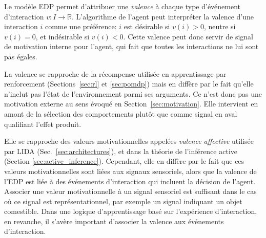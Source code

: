 \noindent
Le modèle EDP permet d'attribuer une \emph{valence} à chaque type d'événement d'interaction  $v: I \to \mathbb{R}$. 
L'algorithme de l'agent peut interpréter la valence d'une interaction $i$ comme une préférence: $i$ est désirable si $v(i) > 0$, neutre si $v(i) = 0$, et indésirable si $v(i) < 0$.
Cette valence peut donc servir de signal de motivation interne pour l'agent, qui fait que toutes les interactions ne lui sont pas égales. 

La valence se rapproche de la récompense utilisée en apprentissage par renforcement (Sections~\ref{sec:rl} et \ref{sec:pomdp}) mais en diffère par le fait qu'elle n'inclut pas l'état de l'environnement parmi ses arguments.
Ce n'est donc pas une motivation externe au sens évoqué en Section~\ref{sec:motivation}.
Elle intervient en amont de la sélection des comportements plutôt que comme signal en aval qualifiant l'effet produit.

Elle se rapproche des valeurs motivationnelles appelées \emph{valence affective} utilisée par LIDA (Sec.~\ref{sec:architectures}), et  dans la théorie de l'inférence active (Section \ref{sec:active_inference}). 
Cependant, elle en diffère par le fait que ces valeurs motivationnelles sont liées aux signaux sensoriels, alors que la valence de l'EDP est liée à des événements d'interaction qui incluent la décision de l'agent. 
Associer une valeur motivationnelle à un signal sensoriel est suffisant dans le cas où ce signal est représentationnel, par exemple un signal indiquant un objet comestible. 
Dans une logique d'apprentissage basé sur l'expérience d'interaction, en revanche, il s'avère important d'associer la valence aux événements d'interaction.


